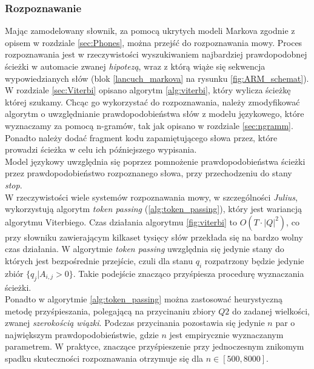 \documentclass[11pt]{article}
\newcommand{\refBlock}[1]{%
	\hyperref[#1]{\ref*{#1}}%
}
\begin{document}
	   \subsubsection{ Rozpoznawanie}
		   \label{sec:recognition}
		   Mając zamodelowany słownik, za pomocą ukrytych modeli Markova zgodnie z opisem w rozdziale \ref{sec:Phones}, można przejść do rozpoznawania mowy. Proces rozpoznawania jest w rzeczywistości wyszukiwaniem najbardziej prawdopodobnej ścieżki w automacie zwanej \textit{hipotezą}, wraz z którą wiąże się sekwencja wypowiedzianych słów (blok \refBlock{lancuch_markova} na rysunku \ref{fig:ARM_schemat}).  W rozdziale \ref{sec:Viterbi} opisano algorytm \ref{alg:viterbi}, który wylicza ścieżkę której szukamy. Chcąc go wykorzystać do rozpoznawania, należy zmodyfikować algorytm o uwzględnianie prawdopodobieństwa słów z modelu językowego, które wyznaczamy za pomocą n-gramów, tak jak opisano w rozdziale \ref{sec:ngramm}. Ponadto należy dodać fragment kodu zapamiętującego słowa przez, które prowadzi ścieżka w celu ich późniejszego wypisania.\\
		   Model językowy uwzględnia się poprzez pomnożenie prawdopodobieństwa ścieżki przez prawdopodobieństwo rozpoznanego słowa, przy przechodzeniu do stany \textit{stop}.\\
		   W rzeczywistości wiele systemów rozpoznawania mowy, w szczególności \textit{Julius}, wykorzystują algorytm \textit{token passing} (\ref{alg:token_passing}), który jest wariancją algorytmu Viterbiego. Czas działania algorytmu \ref{fig:viterbi} to $O(T\cdot |Q|^2)$, co przy słowniku zawierającym kilkaset tysięcy słów przekłada się na bardzo wolny czas działania. W algorytmie \textit{token passing} uwzględnia się jedynie stany do których jest bezpośrednie przejście, czuli dla stanu $q_i$ rozpatrzony będzie jedynie zbiór $\{q_j |  A_{i,j}>0 \}$. Takie podejście znacząco przyśpiesza procedurę wyznaczania ścieżki. \\
		   Ponadto w algorytmie \ref{alg:token_passing} można zastosować heurystyczną metodę przyśpieszania, polegającą na przycinaniu zbiory $Q2$ do zadanej wielkości, zwanej \textit{szerokością wiązki}. Podczas przycinania pozostawia się jedynie $n$ par o największym prawdopodobieństwie, gdzie $n$ jest empirycznie wyznaczanym parametrem. W praktyce, znaczące przyśpieszenie przy jednoczesnym znikomym spadku skuteczności rozpoznawania otrzymuje się dla $n \in [500, 8000]$.
		    
\end{document}
